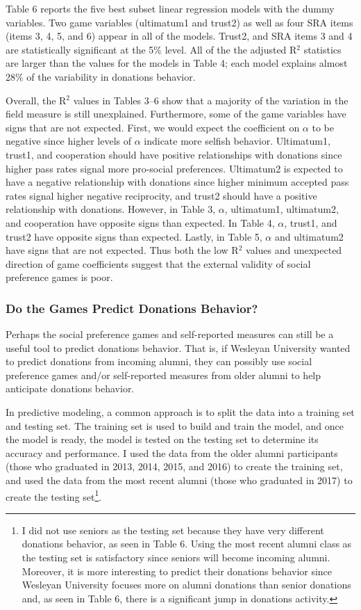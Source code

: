 \documentclass[12pt]{article}
\begin{document}
Table 6 reports the five best subset linear regression models with the dummy variables. Two game variables (ultimatum1 and trust2) as well as four SRA items (items 3, 4, 5, and 6) appear in all of the models. Trust2, and SRA items 3 and 4 are statistically significant at the 5\% level. All of the the adjusted R$^{2}$ statistics are larger than the values for the models in Table 4; each model explains almost 28\% of the variability in donations behavior. 

Overall, the R$^{2}$ values in Tables 3--6 show that a majority of the variation in the field measure is still unexplained. Furthermore, some of the game variables have signs that are not expected. First, we would expect the coefficient on \(\alpha\) to be negative since higher levels of \(\alpha\) indicate more selfish behavior. Ultimatum1, trust1, and cooperation should have positive relationships with donations since higher pass rates signal more pro-social preferences. Ultimatum2 is expected to have a negative relationship with donations since higher minimum accepted pass rates signal higher negative reciprocity, and trust2 should have a positive relationship with donations. However, in Table 3, \(\alpha\), ultimatum1, ultimatum2, and cooperation have opposite signs than expected. In Table 4, \(\alpha\), trust1, and trust2 have opposite signs than expected. Lastly, in Table 5, \(\alpha\) and ultimatum2 have signs that are not expected. Thus both the low R$^{2}$ values and unexpected direction of game coefficients suggest that the external validity of social preference games is poor.


\subsubsection{Do the Games Predict Donations Behavior?}

Perhaps the social preference games and self-reported measures can still be a useful tool to predict donations behavior. That is, if Wesleyan University wanted to predict donations from incoming alumni, they can possibly use social preference games and/or self-reported measures from older alumni to help anticipate donations behavior.

In predictive modeling, a common approach is to split the data into a training set and testing set. The training set is used to build and train the model, and once the model is ready, the model is tested on the testing set to determine its accuracy and performance. I used the data from the older alumni participants (those who graduated in 2013, 2014, 2015, and 2016) to create the training set, and used the data from the most recent alumni (those who graduated in 2017) to create the testing set\footnote{I did not use seniors as the testing set because they have very different donations behavior, as seen in Table 6. Using the most recent alumni class as the testing set is satisfactory since seniors will become incoming alumni. Moreover, it is more interesting to predict their donations behavior since Wesleyan University focuses more on alumni donations than senior donations and, as seen in Table 6, there is a significant jump in donations activity.}. 
\end{document}
